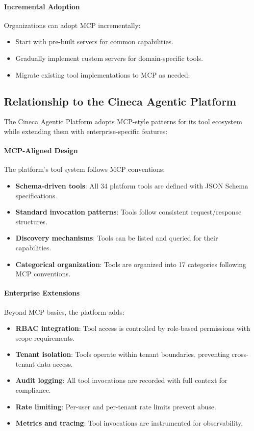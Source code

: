 \paragraph{Incremental Adoption}

Organizations can adopt MCP incrementally:
\begin{itemize}
    \item Start with pre-built servers for common capabilities.
    \item Gradually implement custom servers for domain-specific tools.
    \item Migrate existing tool implementations to MCP as needed.
\end{itemize}

\subsection{Relationship to the Cineca Agentic Platform}

The Cineca Agentic Platform adopts MCP-style patterns for its tool ecosystem while extending them with enterprise-specific features:

\paragraph{MCP-Aligned Design}

The platform's tool system follows MCP conventions:
\begin{itemize}
    \item \textbf{Schema-driven tools}: All 34 platform tools are defined with JSON Schema specifications.
    \item \textbf{Standard invocation patterns}: Tools follow consistent request/response structures.
    \item \textbf{Discovery mechanisms}: Tools can be listed and queried for their capabilities.
    \item \textbf{Categorical organization}: Tools are organized into 17 categories following MCP conventions.
\end{itemize}

\paragraph{Enterprise Extensions}

Beyond MCP basics, the platform adds:
\begin{itemize}
    \item \textbf{RBAC integration}: Tool access is controlled by role-based permissions with scope requirements.
    \item \textbf{Tenant isolation}: Tools operate within tenant boundaries, preventing cross-tenant data access.
    \item \textbf{Audit logging}: All tool invocations are recorded with full context for compliance.
    \item \textbf{Rate limiting}: Per-user and per-tenant rate limits prevent abuse.
    \item \textbf{Metrics and tracing}: Tool invocations are instrumented for observability.
\end{itemize}

